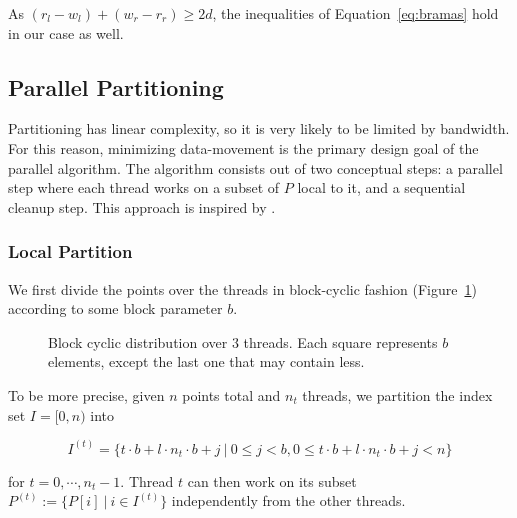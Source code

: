 As $(r_l - w_l) + (w_r - r_r) \geq 2d$, the inequalities of 
Equation~\ref{eq:bramas} hold in our case as well.

\subsection{Parallel Partitioning}

Partitioning has linear complexity, so it is very likely to be limited by
bandwidth. For this reason, minimizing data-movement is the primary design goal
of the parallel algorithm. The algorithm consists out of two conceptual steps:
a parallel step where each thread works on a subset of $P$ local to it, and 
a sequential cleanup step. This approach is inspired by \cite{}.

\subsubsection{Local Partition}

We first divide the points over the threads in block-cyclic fashion 
(Figure~\ref{fig:blockcycl}) according to some block parameter $b$.

\begin{figure}[ht]
    \caption{Block cyclic distribution over $3$ threads. Each square represents
             $b$ elements, except the last one that may contain less.}
    \label{fig:blockcycl}
\end{figure}

To be more precise, given $n$ points total and $n_t$ threads, we partition
the index set $I = [0, n)$ into

$$I^{(t)} = \{t \cdot b + l \cdot n_t \cdot b + j \ | \ 0 \leq j < b,
                0 \leq t \cdot b + l \cdot n_t \cdot b + j < n\}$$

for $t = 0, \cdots, n_t - 1$. Thread $t$ can then work on its subset
$P^{(t)} := \{P[i] \ | \ i \in I^{(t)}\}$ independently from the other threads.

